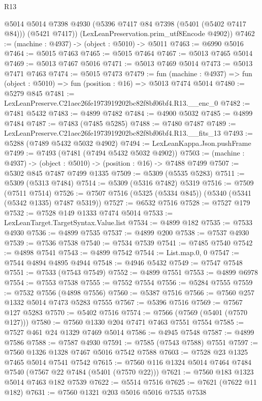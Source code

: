 \begin{lexlean}{R13}
\begin{coremodule}
        @5014
        @5014
        @7398
        @4930
        (@5396 @7417 @84 @7398 (@5401 (@5402 @7417 @84)))
        (@5421 @7417))
      (LexLeanPreservation.prim_utf8Encode @4902))
@7462 := (machine : @4937) -> (object : @5010) -> @5011
@7463 := @6990 @5016
@7464 := @5015 @7463
@7465 := @5015 @7464
@7467 := @5013 @7465 @5014
@7469 := @5013 @7467 @5016
@7471 := @5013 @7469 @5014
@7473 := @5013 @7471 @7463
@7474 := @5015 @7473
@7479 := fun (machine : @4937) => fun (object : @5010) => fun (position : @16) => @5013 @7474 @5014
@7480 := @5279 @845
@7481 := LexLeanPreserve.C21aec26fe1973919202bc82f8bf06bf4.R13.__enc_0
@7482 := @7481 @5432
@7483 := @4899 @7482
@7484 := @4900 @5032
@7485 := @4899 @7484
@7487 := @7483 (@7485 @5285)
@7488 := @7480 @7487
@7489 := LexLeanPreserve.C21aec26fe1973919202bc82f8bf06bf4.R13.__fits_13
@7493 := @5288 (@7489 @5432 @5032 @4902)
@7494 := LexLeanKappa.Json.pushFrame
@7499 := @7493 (@7481 (@7494 @5432 @5032 @4902))
@7503 := (machine : @4937) -> (object : @5010) -> (position : @16) -> @7488 @7499
@7507 := @5302 @845 @7487 @7499 @1335
@7509 := @5309 (@5535 @5283)
@7511 := @5309 (@5313 @7484)
@7514 := @5309 (@5316 @7482) @5319
@7516 := @7509 (@7511 @7514)
@7526 := @7507 @7516 (@5325 (@5334 @845)) (@5340 (@5341 (@5342 @1335) @7487 @5319))
@7527 := @6532 @7516
@7528 := @7527 @179
@7532 := @7528 @149 @1333 @7474 @5014
@7533 := LexLeanTarget.TargetSyntax.Value.list
@7534 := @4899 @182
@7535 := @7533 @4930
@7536 := @4899 @7535
@7537 := @4899 @200
@7538 := @7537 @4930
@7539 := @7536 @7538
@7540 := @7534 @7539
@7541 := @7485 @7540
@7542 := @4898 @7541
@7543 := @4899 @7542
@7544 := List.map.{0, 0}
@7547 := @7544 @4894 @4895 @4944
@7548 := @4946 @5432
@7549 := @7547 @7548
@7551 := @7533 (@7543 @7549)
@7552 := @4899 @7551
@7553 := @4899 @6978
@7554 := @7553 @7538
@7555 := @7552 @7554
@7556 := @5284 @7555
@7559 := @7532 @7556 (@4898 @7556)
@7560 := @5387 @7516
@7566 := @7560 @257 @1332 @5014 @7473 @5283 @7555
@7567 := @5396 @7516
@7569 := @7567 @127 @5283
@7570 := @5402 @7516
@7574 := @7566 (@7569 (@5401 (@7570 @127)))
@7580 := @7560 @1330 @204 @7471 @7463 @7551 @7554
@7585 := @7527 @461 @24 @1329 @7469 @5014
@7586 := @4945 @7548
@7587 := @4899 @7586
@7588 := @7587 @4930
@7591 := @7585 (@7543 @7588) @7551
@7597 := @7560 @1326 @1328 @7467 @5016 @7542 @7588
@7603 := @7528 @23 @1325 @7465 @5014 @7541 @7542
@7615 := @7560 @116 @1324 @5014 @7464 @7484 @7540 (@7567 @22 @7484 (@5401 (@7570 @22)))
@7621 := @7560 @183 @1323 @5014 @7463 @182 @7539
@7622 := @5514 @7516
@7625 := @7621 (@7622 @11 @182)
@7631 := @7560 @1321 @203 @5016 @5016 @7535 @7538

\end{coremodule}
\end{lexlean}
